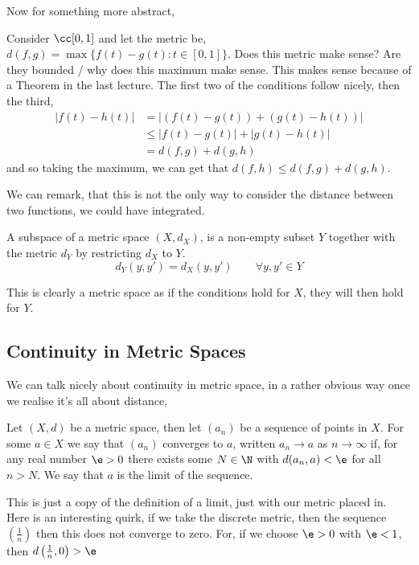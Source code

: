 Now for something more abstract,
\begin{eg}
  Consider $\cc[0, 1]$ and let the metric be, $d(f, g) = \max\{f(t) - g(t) : t \in [0,1] \}$. Does this metric make sense? Are they bounded / why does this maximum make sense. This makes sense because of a Theorem in the last lecture. The first two of the conditions follow nicely, then the third,
  \begin{align*}
    |f(t) - h(t)| &= |(f(t) - g(t)) + (g(t) - h(t))|\\
    &\le |f(t) - g(t)| + |g(t) - h(t)|\\
    &= d(f, g) + d(g, h)
  \end{align*}
  and so taking the maximum, we can get that $d(f, h) \le d(f, g) + d(g, h)$.
\end{eg}

We can remark, that this is not the only way to consider the distance between two functions, we could have integrated.

\begin{ndefi}[Subspace]
  A subspace of a metric space $(X, d_X)$, is a non-empty subset $Y$ together with the metric $d_Y$ by restricting $d_X$ to $Y$.
  $$ d_Y(y, y') = d_X(y, y') \qquad \forall y, y' \in Y $$
\end{ndefi}
This is clearly a metric space as if the conditions hold for $X$, they will then hold for $Y$.

\subsection{Continuity in Metric Spaces}
We can talk nicely about continuity in metric space, in a rather obvious way once we realise it's all about distance,
\begin{ndefi}[Limit]
  Let $(X, d)$ be a metric space, then let $(a_n)$ be a sequence of points in $X$. For some $a \in X$ we say that $(a_n)$ converges to $a$, written $a_n \to a$ as $n \to \infty$ if, for any real number $\e > 0$ there exists some $N \in \N$ with $d(a_n, a) < \e$ for all $n > N$. We say that $a$ is the limit of the sequence.
\end{ndefi}

\noindent
This is just a copy of the definition of a limit, just with our metric placed in. Here is an interesting quirk, if we take the discrete metric, then the sequence $\left( \frac{1}{n} \right)$ then this does not converge to zero. For, if we choose $\e > 0$ with $\e < 1$, then $d\left(\frac{1}{n}, 0 \right) > \e$

